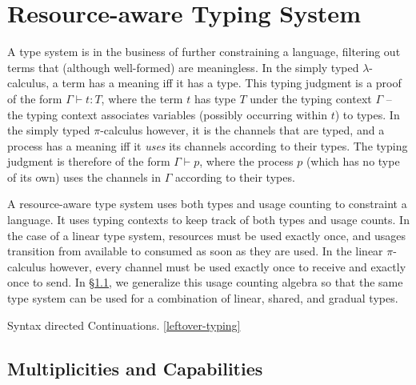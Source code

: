 \documentclass[a4paper,UKenglish,cleveref, autoref, thm-restate,authorcolumns]{lipics-v2019}
\theoremstyle{definition}
\newcommand{\lambdacalc}{$\lambda$-calculus}
\newcommand{\picalc}{$\pi$-calculus}
\begin{document}
\section{Resource-aware Typing System}
\label{type-system}


A type system is in the business of further constraining a language, filtering out terms that (although well-formed) are meaningless.
In the simply typed \lambdacalc{}, a term has a meaning iff it has a type.
This typing judgment is a proof of the form $\Gamma \vdash t : T$, where the term $t$ has type $T$ under the typing context $\Gamma$ -- the typing context associates variables (possibly occurring within $t$) to types.
In the simply typed \picalc{} however, it is the channels that are typed, and a process has a meaning iff it \emph{uses} its channels according to their types.
The typing judgment is therefore of the form $\Gamma \vdash p$, where the process $p$ (which has no type of its own) uses the channels in $\Gamma$ according to their types.

A resource-aware type system uses both types and usage counting to constraint a language.
It uses typing contexts to keep track of both types and usage counts.
In the case of a linear type system, resources must be used exactly once, and usages transition from available to consumed as soon as they are used.
In the linear \picalc{} however, every channel must be used exactly once to receive and exactly once to send.
In \S \ref{multiplicities}, we generalize this usage counting algebra so that the same type system can be used for a combination of linear, shared, and gradual types.


Syntax directed
Continuations.
\ref{leftover-typing}

\subsection{Multiplicities and Capabilities}
\label{multiplicities}
\end{document}
